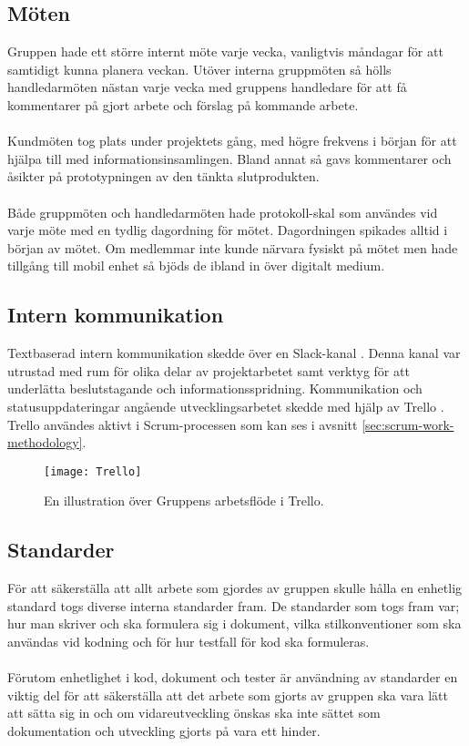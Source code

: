 \subsection{Möten}
Gruppen hade ett större internt möte varje vecka, vanligtvis måndagar för att samtidigt kunna planera veckan. Utöver interna gruppmöten så hölls handledarmöten nästan varje vecka med gruppens handledare för att få kommentarer på gjort arbete och förslag på kommande arbete.
\\ \\
Kundmöten tog plats under projektets gång, med högre frekvens i början för att hjälpa till med informationsinsamlingen. Bland annat så gavs kommentarer och åsikter på prototypningen av den tänkta slutprodukten.
\\ \\
Både gruppmöten och handledarmöten hade protokoll-skal som användes vid varje möte med en tydlig dagordning för mötet. Dagordningen spikades alltid i början av mötet. Om medlemmar inte kunde närvara fysiskt på mötet men hade tillgång till mobil enhet så bjöds de ibland in över digitalt medium. 

\subsection{Intern kommunikation}
\label{sec:internal_communication}
Textbaserad intern kommunikation skedde över en Slack-kanal \cite{website:slack}. Denna kanal var utrustad med rum för olika delar av projektarbetet samt verktyg för att underlätta beslutstagande och informationsspridning. Kommunikation och statusuppdateringar angående utvecklingsarbetet skedde med hjälp av Trello \cite{website:trello}. Trello användes aktivt i Scrum-processen som kan ses i avsnitt \ref{sec:scrum-work-methodology}.

\begin{figure}[h]
  \centering
  \texttt{[image: Trello]}
  \caption{En illustration över Gruppens arbetsflöde i Trello.}
  \label{fig:trello}
\end{figure}

\subsection{Standarder}
För att säkerställa att allt arbete som gjordes av gruppen skulle hålla en enhetlig standard togs diverse interna standarder fram. De standarder som togs fram var; hur man skriver och ska formulera sig i dokument, vilka stilkonventioner som ska användas vid kodning och för hur testfall för kod ska formuleras.
\\ \\
Förutom enhetlighet i kod, dokument och tester är användning av standarder en viktig del för att säkerställa att det arbete som gjorts av gruppen ska vara lätt att sätta sig in och om vidareutveckling önskas ska inte sättet som dokumentation och utveckling gjorts på vara ett hinder.


